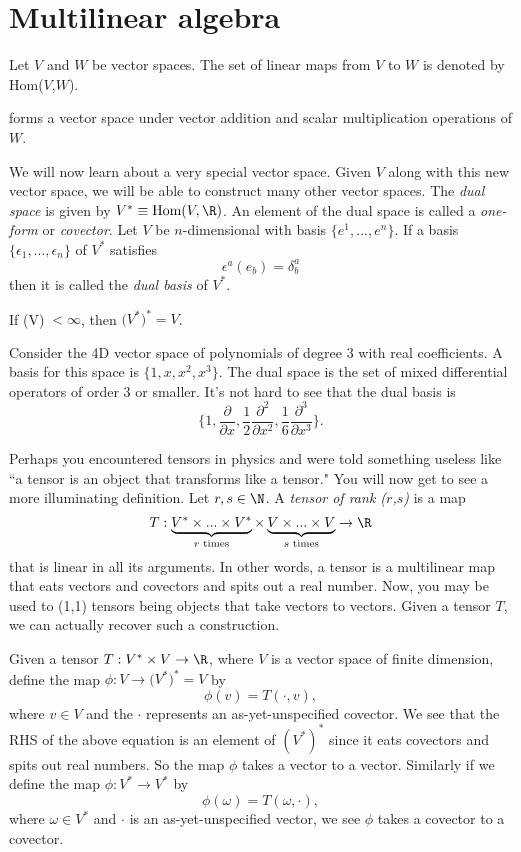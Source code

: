 \section{Multilinear algebra}
Let $V$ and $W$ be vector spaces.
The set of linear maps from $V$ to $W$ is denoted by Hom($V$,$W$).
\begin{proposition}{}{}
   forms a vector space under vector addition 
  and scalar multiplication operations of $W$. 
\end{proposition}
We will now learn about a very special vector space. Given $V$ along with
this new vector space, we will be able to construct many other vector spaces.
The {\it dual space} 
is given by $V^*\equiv\text{Hom}(V,\R)$.
An element of the dual space is called a {\it one-form} or {\it covector}.
Let $V$ be $n$-dimensional with basis $\{e^1,...,e^n\}$. If a basis
$\{\epsilon_1,...,\epsilon_n\}$ of $V^*$ satisfies
  $$\epsilon^a(e_b)=\delta^a_b$$
then it is called the {\it dual basis} of $V^*$.
\begin{theorem}{}{}
  If (V)$\;<\infty$, then $\big(V^*\big)^*=V$.
\end{theorem}
\begin{example*}{}{}
  Consider the 4D vector space of polynomials of degree 3 with
  real coefficients. A basis for this space is $\{1,x,x^2,x^3\}$. 
  The dual space is the set of mixed differential operators of order 3 or 
  smaller. It's not hard to see that the dual basis is 
  $$\Bigg\{1,\frac{\partial}{\partial x},
             \frac{1}{2}\frac{\partial^2}{\partial x^2},
             \frac{1}{6}\frac{\partial^3}{\partial x^3}\Bigg\}.$$
\end{example*}
Perhaps you encountered tensors in physics and were told something useless
like ``a tensor is an object that transforms like a tensor."
You will now get to see a more illuminating definition.
  Let $r,s\in\N$.
  A {\it tensor of rank ($r$,$s$)} is a map
  $$T:\underbrace{V^*\times...\times V^*}_\text{$r$ times}\times
      \underbrace{V\times...\times V}_\text{$s$ times}\to\R$$
  that is linear in all its arguments.
In other words, a tensor is a multilinear map that eats
vectors and covectors and spits out a real number. Now, you may be used
to (1,1) tensors being objects that take vectors to vectors. Given
a tensor $T$, we can actually recover such a construction.
\begin{example*}{}{}
  Given a tensor $T:V^*\times V\to\R$, where $V$ is a vector space
  of finite dimension, define the map $\phi:V\to \big(V^*\big)^*=V$ by
  $$\phi(v)=T(\cdot,v),$$
  where $v\in V$ and the $\cdot$ represents an as-yet-unspecified covector. 
  We see that the RHS of the above equation is an element of $(V^*)^*$ 
  since it eats covectors and spits out real numbers. So the map $\phi$ takes
  a vector to a vector. Similarly if we 
  define the map $\phi:V^*\to V^*$ by
  $$\phi(\omega)=T(\omega,\cdot),$$
  where $\omega\in V^*$ and $\cdot$ is an as-yet-unspecified vector, we see
  $\phi$ takes a covector to a covector.
\end{example*}

